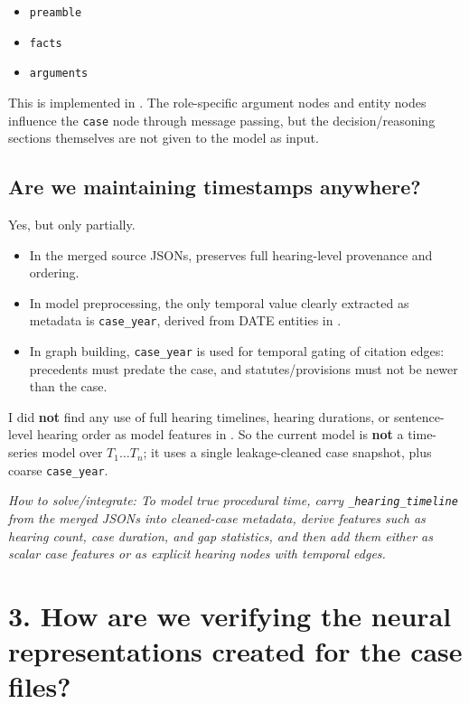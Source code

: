 \documentclass[12pt,a4paper]{article}
\newcommand{\futurework}[1]{\textcolor{futureblue}{\textit{How to solve/integrate: #1}}}
\begin{document}
\begin{itemize}[noitemsep]
\item \texttt{preamble}
\item \texttt{facts}
\item \texttt{arguments}
\end{itemize}

This is implemented in . The role-specific argument nodes and entity nodes influence the \texttt{case} node through message passing, but the decision/reasoning sections themselves are not given to the model as input.

\subsection*{Are we maintaining timestamps anywhere?}

Yes, but only partially.

\begin{itemize}[noitemsep]
\item In the merged source JSONs,  preserves full hearing-level provenance and ordering.
\item In model preprocessing, the only temporal value clearly extracted as metadata is \texttt{case\_year}, derived from DATE entities in .
\item In graph building, \texttt{case\_year} is used for temporal gating of citation edges: precedents must predate the case, and statutes/provisions must not be newer than the case.
\end{itemize}

I did \textbf{not} find any use of full hearing timelines, hearing durations, or sentence-level hearing order as model features in . So the current model is \textbf{not} a time-series model over \(T_1 \ldots T_n\); it uses a single leakage-cleaned case snapshot, plus coarse \texttt{case\_year}.

\futurework{To model true procedural time, carry \texttt{\_hearing\_timeline} from the merged JSONs into cleaned-case metadata, derive features such as hearing count, case duration, and gap statistics, and then add them either as scalar case features or as explicit hearing nodes with temporal edges.}

\section*{3. How are we verifying the neural representations created for the case files?}
\end{document}
